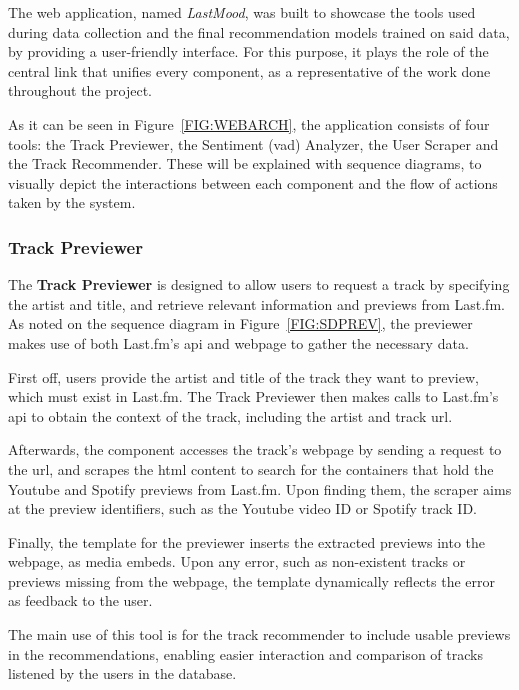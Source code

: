 The web application, named \emph{LastMood}, was built to showcase the tools used during data collection and the final recommendation models trained on said data, by providing a user-friendly interface. For this purpose, it plays the role of the central link that unifies every component, as a representative of the work done throughout the project.

As it can be seen in Figure~\ref{FIG:WEBARCH}, the application consists of four tools: the Track Previewer, the Sentiment (\acs{vad}) Analyzer, the User Scraper and the Track Recommender. These will be explained with sequence diagrams, to visually depict the interactions between each component and the flow of actions taken by the system.

\subsubsection{Track Previewer}

The \textbf{Track Previewer} is designed to allow users to request a track by specifying the artist and title, and retrieve relevant information and previews from Last.fm\@. As noted on the sequence diagram in Figure~\ref{FIG:SDPREV}, the previewer makes use of both Last.fm's \acs{api} and webpage to gather the necessary data.

\begin{compactenum}[\bfseries 1.]
    \item First off, users provide the artist and title of the track they want to preview, which must exist in Last.fm\@. The Track Previewer then makes calls to Last.fm's \acs{api} to obtain the context of the track, including the artist and track \acs{url}\@.
    \item Afterwards, the component accesses the track's webpage by sending a request to the \acs{url}, and scrapes the \acs{html} content to search for the containers that hold the Youtube and Spotify previews from Last.fm\@. Upon finding them, the scraper aims at the preview identifiers, such as the Youtube video ID or Spotify track ID\@.
    \item Finally, the template for the previewer inserts the extracted previews into the webpage, as media embeds. Upon any error, such as non-existent tracks or previews missing from the webpage, the template dynamically reflects the error as feedback to the user.
\end{compactenum}

The main use of this tool is for the track recommender to include usable previews in the recommendations, enabling easier interaction and comparison of tracks listened by the users in the database.

